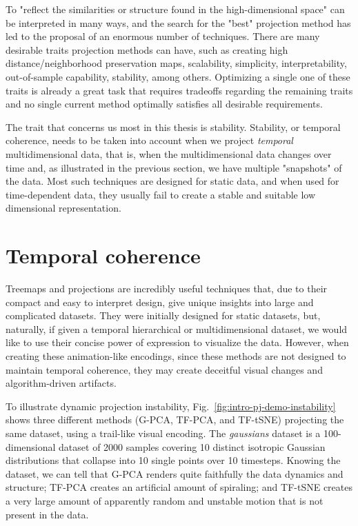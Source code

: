 To "reflect the similarities or structure found in the high-dimensional space" can be interpreted in many ways, and the search for the "best" projection method has led to the proposal of an enormous number of techniques.
There are many desirable traits projection methods can have, such as creating high distance/neighborhood preservation maps, scalability, simplicity, interpretability, out-of-sample capability, stability, among others. 
Optimizing a single one of these traits is already a great task that requires tradeoffs regarding the remaining traits and no single current method optimally satisfies all desirable requirements.

The trait that concerns us most in this thesis is stability. Stability, or temporal coherence, needs to be taken into account when we project \emph{temporal} multidimensional data, that is, when the multidimensional data changes over time and, as illustrated in the previous section, we have multiple "snapshots" of the data. 
Most such techniques are designed for static data, and when used for time-dependent data, they usually fail to create a stable and suitable low dimensional representation.

\section{Temporal coherence}

Treemaps and projections are incredibly useful techniques that, due to their compact and easy to interpret design, give unique insights into large and complicated datasets.
They were initially designed for static datasets, but, naturally, if given a temporal hierarchical or multidimensional dataset, we would like to use their concise power of expression to visualize the data. However, when creating these animation-like encodings, since these methods are not designed to maintain temporal coherence, they may create deceitful visual changes and algorithm-driven artifacts.

To illustrate dynamic projection instability, Fig.~\ref{fig:intro-pj-demo-instability} shows three different methods (G-PCA, TF-PCA, and TF-tSNE) projecting the same dataset, using a trail-like visual encoding. The \emph{gaussians} dataset is a 100-dimensional dataset of 2000 samples covering 10 distinct isotropic Gaussian distributions that collapse into 10 single points over 10 timesteps. Knowing the dataset, we can tell that G-PCA renders quite faithfully the data dynamics and structure; TF-PCA creates an artificial amount of spiraling; and TF-tSNE creates a very large amount of apparently random and unstable motion that is not present in the data.  


